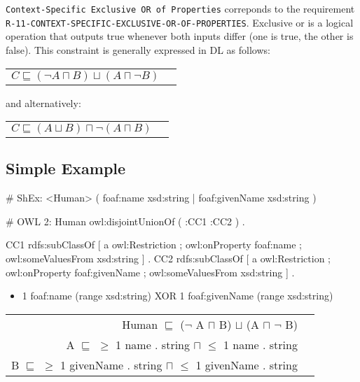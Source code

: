 \documentclass{llncs}
\newcommand{\ms}[1]{\texttt{#1}}
\newenvironment{DL}{
  \vspace{0cm}
	\begin{center}
  \begin{tabular}{r l}

}{
  \end{tabular}
	\end{center}
}
\begin{document}
\ms{Context-Specific Exclusive OR of Properties} correponds to the requirement
\ms{R-11-CONTEXT-SPECIFIC-EXCLUSIVE-OR-OF-PROPERTIES}.
Exclusive or is a logical operation that outputs true whenever both inputs differ (one is true, the other is false).
This constraint is generally expressed in DL as follows:

\begin{DL}
$C \sqsubseteq (\neg A \sqcap B) \sqcup (A \sqcap \neg B)$ \\
\end{DL}

and alternatively:

\begin{DL}
$C \sqsubseteq (A \sqcup B) \sqcap \neg(A \sqcap B)$ \\
\end{DL}

\subsection{Simple Example}

\begin{ex}
# ShEx:
<Human> { (  
    foaf:name xsd:string | 
    foaf:givenName xsd:string ) }
\end{ex}

\begin{ex}
# OWL 2:
Human owl:disjointUnionOf ( :CC1 :CC2 ) . 

CC1 rdfs:subClassOf [
    a owl:Restriction ;
    owl:onProperty foaf:name ;
    owl:someValuesFrom xsd:string ] .
CC2 rdfs:subClassOf [
    a owl:Restriction ;
    owl:onProperty foaf:givenName ;
    owl:someValuesFrom xsd:string ] .
\end{ex}

\begin{itemize}
	\item 1 foaf:name (range xsd:string) XOR 1 foaf:givenName (range xsd:string)
\end{itemize}

\begin{DL}
Human $\sqsubseteq$ ($\neg$ A $\sqcap$ B) $\sqcup$ (A $\sqcap$ $\neg$ B) \\
A $\sqsubseteq$ $\geq$ 1 name . string $\sqcap$ $\leq$ 1 name . string \\
B $\sqsubseteq$ $\geq$ 1 givenName . string $\sqcap$ $\leq$ 1 givenName . string \\
\end{DL}
\end{document}
